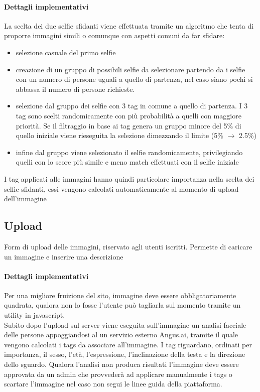 \documentclass{article}
\begin{document}
\paragraph*{Dettagli implementativi}
La scelta dei due selfie sfidanti viene effettuata tramite un algoritmo che tenta di proporre immagini simili o comunque con aspetti comuni da far sfidare:
\begin{itemize}
\item selezione casuale del primo selfie
\item creazione di un gruppo di possibili selfie da selezionare partendo da i selfie con un numero di persone uguali a quello di partenza, nel caso siano pochi si abbassa il numero di persone richieste.
\item selezione dal gruppo dei selfie con 3 tag in comune a quello di partenza. I 3 tag sono scelti randomicamente con più probabilità a quelli con maggiore priorità. Se il filtraggio in base ai tag genera un gruppo minore del 5\% di quello iniziale viene rieseguita la selezione dimezzando il limite (5\% $\to$ 2.5\%)
\item infine dal gruppo viene selezionato il selfie randomicamente, privilegiando quelli con lo score più simile e meno match effettuati con il selfie iniziale
\end{itemize}
I tag applicati alle immagini hanno quindi particolare importanza nella scelta dei selfie sfidanti, essi vengono calcolati automaticamente al momento di upload dell'immagine

\subsection{Upload}
Form di upload delle immagini, riservato agli utenti iscritti.
Permette di caricare un immagine e inserire una descrizione\\

\paragraph*{Dettagli implementativi}
Per una migliore fruizione del sito, immagine deve essere obbligatoriamente quadrata, qualora non lo fosse l'utente può tagliarla sul momento tramite un utility in javascript.\\
Subito dopo l'upload sul server viene eseguita sull'immagine un analisi facciale delle persone appoggiandosi al un servizio esterno Angus.ai, tramite il quale vengono calcolati i tags da associare all'immagine.
I tag riguardano, ordinati per importanza, il sesso, l'età, l'espressione, l'inclinazione della testa e la direzione dello sguardo.
Qualora l'analisi non produca risultati l'immagine deve essere approvata da un admin che provvederà ad applicare manualmente i tags o scartare l'immagine nel caso non segui le linee guida della piattaforma.
\end{document}
